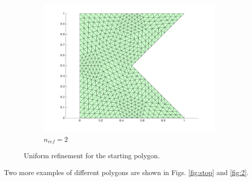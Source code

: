 \documentclass[10pt]{article}
\begin{document}
\begin{figure}[H]
\begin{subfigure}[b]{0.35\textwidth}
                \includegraphics[width=\textwidth]{refine2.png}
                \caption{\(n_{ref}=2\)}
        \end{subfigure}%
        \caption{Uniform refinement for the starting polygon.}
        \label{fig:original}
\end{figure}

Two more examples of different polygons are shown in Figs. \ref{fig:stop} and \ref{fig:2}.
\end{document}
